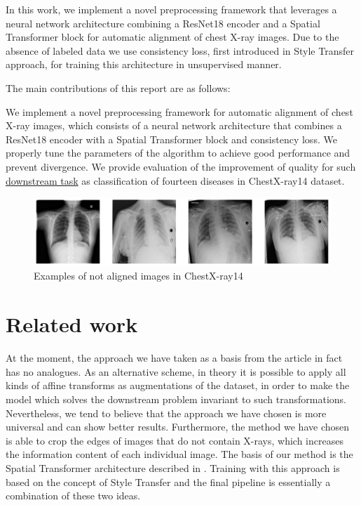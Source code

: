\documentclass{article}
\begin{document}
In this work, we implement a novel preprocessing framework that leverages a 
 neural network architecture combining a ResNet18 encoder and a Spatial 
 Transformer block for automatic alignment of chest X-ray images. Due to the 
 absence of labeled data we use consistency loss, first introduced in Style 
 Transfer approach, for training this architecture in unsupervised manner.

The main contributions of this report are as follows:

We implement a novel preprocessing framework for automatic alignment of chest
 X-ray images, which consists of a neural network architecture that combines 
 a ResNet18 encoder with a Spatial Transformer block and consistency loss. 
We properly tune the parameters of the algorithm to achieve good performance
 and prevent divergence.
We provide evaluation of the improvement of quality for such 
 \href{https://paperswithcode.com/sota/multi-label-classification-on-chestx-ray14}{downstream task}
 as classification of fourteen diseases in ChestX-ray14 dataset.

\begin{figure}[ht]\label{icml-historical}
    \vskip 0.2in
    \begin{center}
    \centerline{\includegraphics[width=\columnwidth]{../images/initial_images.png}}
    \caption{Examples of not aligned images in ChestX-ray14}
    \end{center}
    \vskip -0.2in
\end{figure}

\section{Related work}\label{related_work}

At the moment, the approach we have taken as a basis from the article \cite{XRayDiagnosis}
 in fact has no analogues. As an alternative scheme, in theory it is 
 possible to apply all kinds of affine transforms as augmentations of the dataset, 
 in order to make the model which solves the downstream problem invariant to such 
 transformations. Nevertheless, we tend to believe that the approach we have chosen 
 is more universal and can show better results. Furthermore, the method we have 
 chosen is able to crop the edges of images that do not contain X-rays, which 
 increases the information content of each individual image. The basis of our 
 method is the Spatial Transformer architecture described in \cite{SpatialTransform}. 
 Training with this approach is based on the concept of Style Transfer \cite{StyleTransfer} and 
 the final pipeline is essentially a combination of these two ideas.
\end{document}
